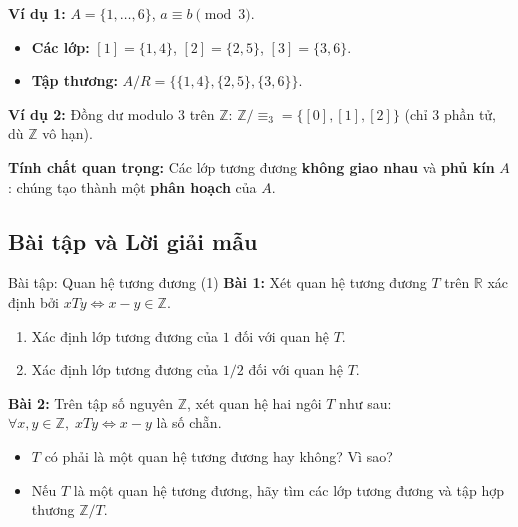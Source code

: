 \documentclass[12pt,a4paper]{article}
\begin{document}
\noindent
\begin{minipage}[c]{0.52\textwidth}
\textbf{\textcolor{AccentRed}{Ví dụ 1:}} $A = \{1, \dots, 6\}$, $a \equiv b \pmod{3}$.
\begin{itemize}
  \item \textbf{Các lớp:} $[1] = \{1, 4\}$, $[2] = \{2, 5\}$, $[3] = \{3, 6\}$.
  \item \textbf{Tập thương:} $A/R = \{\{1, 4\}, \{2, 5\}, \{3, 6\}\}$.
\end{itemize}
\end{minipage}
\hfill
\begin{minipage}[c]{0.44\textwidth}
\centering
{}
\end{minipage}

\textbf{\textcolor{AccentRed}{Ví dụ 2:}} Đồng dư modulo $3$ trên $\mathbb{Z}$: $\mathbb{Z}/{\equiv_3} = \{[0], [1], [2]\}$ (chỉ $3$ phần tử, dù $\mathbb{Z}$ vô hạn).

\textbf{Tính chất quan trọng:} Các lớp tương đương \textbf{không giao nhau} và \textbf{phủ kín} $A$: chúng tạo thành một \textbf{phân hoạch} của $A$.

\subsection{Bài tập và Lời giải mẫu}

\begin{baitap}{Bài tập: Quan hệ tương đương (1)}
\textbf{Bài 1:} Xét quan hệ tương đương $T$ trên $\mathbb{R}$ xác định bởi $xTy \iff x - y \in \mathbb{Z}$.
\begin{enumerate}[label=\alph*)]
  \item Xác định lớp tương đương của $1$ đối với quan hệ $T$.
  \item Xác định lớp tương đương của $1/2$ đối với quan hệ $T$.
\end{enumerate}

\textbf{Bài 2:} Trên tập số nguyên $\mathbb{Z}$, xét quan hệ hai ngôi $T$ như sau: $\forall x, y \in \mathbb{Z},\; xTy \iff x - y$ là số chẵn.
\begin{itemize}
  \item $T$ có phải là một quan hệ tương đương hay không? Vì sao?
  \item Nếu $T$ là một quan hệ tương đương, hãy tìm các lớp tương đương và tập hợp thương $\mathbb{Z}/T$.
\end{itemize}
\end{baitap}
\end{document}
